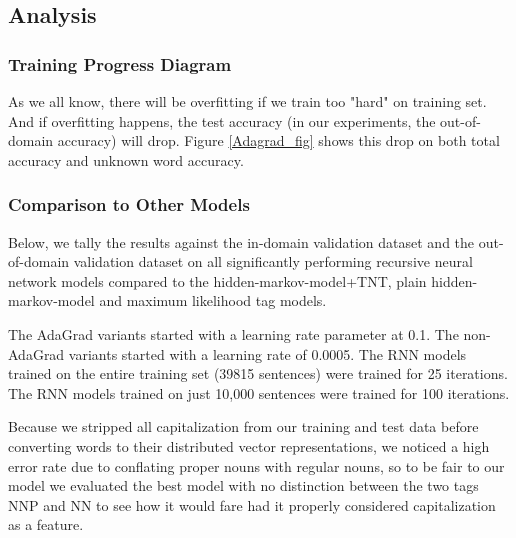 \documentclass[11pt]{article}
\begin{document}
\subsection{Analysis}

\subsubsection{Training Progress Diagram}
As we all know, there will be overfitting if we train too "hard" on training set. And if overfitting happens, the test accuracy (in our experiments, the out-of-domain accuracy) will drop. Figure \ref{Adagrad_fig} shows this drop on both total accuracy and unknown word accuracy.

\subsubsection{Comparison to Other Models}

Below, we tally the results against the in-domain validation dataset and the out-of-domain validation dataset on all significantly performing recursive neural network models compared to the hidden-markov-model+TNT, plain hidden-markov-model and maximum likelihood tag models.

The AdaGrad variants started with a learning rate parameter at 0.1. The non-AdaGrad variants started with a learning rate of 0.0005. The RNN models trained on the entire training set (39815 sentences) were trained for 25 iterations. The RNN models trained on just 10,000 sentences were trained for 100 iterations.

Because we stripped all capitalization from our training and test data before converting words to their distributed vector representations, we noticed a high error rate due to conflating proper nouns with regular nouns, so to be fair to our model we evaluated the best model with no distinction between the two tags NNP and NN to see how it would fare had it properly considered capitalization as a feature.

\begin{center}
\end{center}
\end{document}
